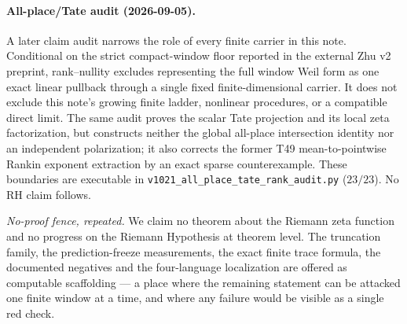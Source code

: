 \documentclass[11pt,a4paper]{article}
\theoremstyle{remark}
\begin{document}
\paragraph{All-place/Tate audit (2026-09-05).}
A later claim audit narrows the role of every finite carrier in this
note.  Conditional on the strict compact-window floor reported in the
external Zhu v2 preprint, rank--nullity excludes representing the full
window Weil form as one exact linear pullback through a single fixed
finite-dimensional carrier.  It does not exclude this note's growing
finite ladder, nonlinear procedures, or a compatible direct limit.
The same audit proves the scalar Tate projection and its local zeta
factorization, but constructs neither the global all-place intersection
identity nor an independent polarization; it also corrects the former
T49 mean-to-pointwise Rankin exponent extraction by an exact sparse
counterexample.  These boundaries are executable in
\texttt{v1021\_\allowbreak all\_\allowbreak place\_\allowbreak tate\_\allowbreak rank\_\allowbreak audit.py}
($23/23$).  No RH claim follows.

\emph{No-proof fence, repeated.}  We claim no theorem about the
Riemann zeta function and no progress on the Riemann Hypothesis at
theorem level.  The truncation family, the prediction-freeze
measurements, the exact finite trace formula, the documented
negatives and the four-language localization are offered as
computable scaffolding --- a place where the remaining statement can
be attacked one finite window at a time, and where any failure would
be visible as a single red check.
\end{document}
